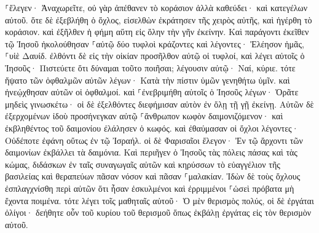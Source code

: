 \documentclass[twoside, 9pt]{extreport}
\begin{document}
⸀ἔλεγεν· Ἀναχωρεῖτε, οὐ γὰρ ἀπέθανεν τὸ κοράσιον ἀλλὰ καθεύδει· καὶ κατεγέλων αὐτοῦ. 
ὅτε δὲ ἐξεβλήθη ὁ ὄχλος, εἰσελθὼν ἐκράτησεν τῆς χειρὸς αὐτῆς, καὶ ἠγέρθη τὸ κοράσιον. 
καὶ ἐξῆλθεν ἡ φήμη αὕτη εἰς ὅλην τὴν γῆν ἐκείνην. 
Καὶ παράγοντι ἐκεῖθεν τῷ Ἰησοῦ ἠκολούθησαν ⸀αὐτῷ δύο τυφλοὶ κράζοντες καὶ λέγοντες· Ἐλέησον ἡμᾶς, ⸀υἱὲ Δαυίδ. 
ἐλθόντι δὲ εἰς τὴν οἰκίαν προσῆλθον αὐτῷ οἱ τυφλοί, καὶ λέγει αὐτοῖς ὁ Ἰησοῦς· Πιστεύετε ὅτι δύναμαι τοῦτο ποιῆσαι; λέγουσιν αὐτῷ· Ναί, κύριε. 
τότε ἥψατο τῶν ὀφθαλμῶν αὐτῶν λέγων· Κατὰ τὴν πίστιν ὑμῶν γενηθήτω ὑμῖν. 
καὶ ἠνεῴχθησαν αὐτῶν οἱ ὀφθαλμοί. καὶ ⸀ἐνεβριμήθη αὐτοῖς ὁ Ἰησοῦς λέγων· Ὁρᾶτε μηδεὶς γινωσκέτω· 
οἱ δὲ ἐξελθόντες διεφήμισαν αὐτὸν ἐν ὅλῃ τῇ γῇ ἐκείνῃ. 
Αὐτῶν δὲ ἐξερχομένων ἰδοὺ προσήνεγκαν αὐτῷ ⸀ἄνθρωπον κωφὸν δαιμονιζόμενον· 
καὶ ἐκβληθέντος τοῦ δαιμονίου ἐλάλησεν ὁ κωφός. καὶ ἐθαύμασαν οἱ ὄχλοι λέγοντες· Οὐδέποτε ἐφάνη οὕτως ἐν τῷ Ἰσραήλ. 
οἱ δὲ Φαρισαῖοι ἔλεγον· Ἐν τῷ ἄρχοντι τῶν δαιμονίων ἐκβάλλει τὰ δαιμόνια. 
Καὶ περιῆγεν ὁ Ἰησοῦς τὰς πόλεις πάσας καὶ τὰς κώμας, διδάσκων ἐν ταῖς συναγωγαῖς αὐτῶν καὶ κηρύσσων τὸ εὐαγγέλιον τῆς βασιλείας καὶ θεραπεύων πᾶσαν νόσον καὶ πᾶσαν ⸀μαλακίαν. 
Ἰδὼν δὲ τοὺς ὄχλους ἐσπλαγχνίσθη περὶ αὐτῶν ὅτι ἦσαν ἐσκυλμένοι καὶ ἐρριμμένοι ⸀ὡσεὶ πρόβατα μὴ ἔχοντα ποιμένα. 
τότε λέγει τοῖς μαθηταῖς αὐτοῦ· Ὁ μὲν θερισμὸς πολύς, οἱ δὲ ἐργάται ὀλίγοι· 
δεήθητε οὖν τοῦ κυρίου τοῦ θερισμοῦ ὅπως ἐκβάλῃ ἐργάτας εἰς τὸν θερισμὸν αὐτοῦ. 
\end{document}
